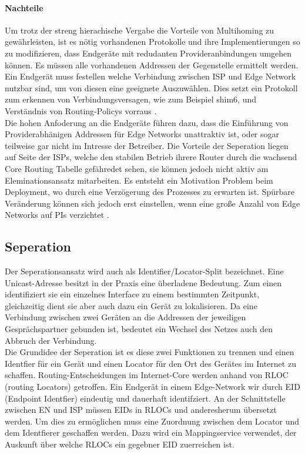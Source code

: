 \paragraph{Nachteile} %
Um trotz der streng hierachische Vergabe die Vorteile von Multihoming zu gewährleisten, ist es nötig vorhandenen Protokolle und ihre Implementierungen so zu modifizieren, dass Endgeräte mit redudanten Provideranbindungen umgehen können. Es müssen alle vorhandenen Addressen der Gegenstelle ermittelt werden. Ein Endgerät muss festellen welche Verbindung zwischen ISP und Edge Network nutzbar sind, um von diesen eine geeignete Auszuwählen. Dies setzt ein Protokoll zum erkennen von Verbindungsversagen, wie zum Beispiel shim6, und Verständnis von Routing-Policys vorraus \cite{jen:2008:start}. \\
Die hohen Anfoderung an die Endgeräte führen dazu, dass die Einführung von Providerabhänigen Addressen für Edge Networks unattraktiv ist, oder sogar teilweise gar nicht im Intresse der Betreiber. Die Vorteile der Seperation liegen auf Seite der ISPs, welche den stabilen Betrieb ihrere Router durch die wachsend Core Routing Tabelle gefähredet sehen, sie können jedoch nicht aktiv am Eleminationsansatz mitarbeiten. Es entsteht ein Motivation Problem beim Deployment, wo durch eine Verzögerung des Prozesses zu erwarten ist. Spürbare Veränderung können sich jedoch erst einstellen, wenn eine große Anzahl von Edge Networks auf PIs verzichtet \cite{jen:2008:start}. 

\subsection{Seperation} %
Der Seperationsansatz wird auch als Identifier/Locator-Split bezeichnet. Eine Unicast-Adresse besitzt in der Praxis eine überladene Bedeutung. Zum einen identifiziert sie ein einzelnes Interface zu einem bestimmten Zeitpunkt, gleichzeitig dient sie aber auch dazu ein Gerät zu lokalisieren. Da eine Verbindung zwischen zwei Geräten an die Addressen der jeweiligen Gesprächspartner gebunden ist, bedeutet ein Wechsel des Netzes auch den Abbruch der Verbindung.  \\

Die Grundidee der Seperation ist es diese zwei Funktionen zu trennen und einen Identfier für ein Gerät und einen Locator für den Ort des Gerätes im Internet zu schaffen. Routing-Entscheidungen im Internet-Core werden anhand von RLOC (routing Locators) getroffen. Ein Endgerät in einem Edge-Network wir durch EID (Endpoint Identfier) eindeutig und dauerhaft identifziert. An der Schnittstelle zwischen EN und ISP müssen EIDs in RLOCs und anderesherum übersetzt werden. Um dies zu ermöglichen muss eine Zuordnung zwischen dem Locator und dem Identfierer geschaffen werden. Dazu wird ein Mappingservice verwendet, der Auskunft über welche RLOCs ein gegebner EID zuerreichen ist. 

